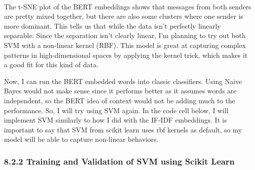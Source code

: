\documentclass[11pt]{article}
\begin{document}
    \begin{center}
    \end{center}
    { \hspace*{\fill} \\}
    
    The t-SNE plot of the BERT embeddings shows that messages from both
senders are pretty mixed together, but there are also some clusters
where one sender is more dominant. This tells us that while the data
isn't perfectly linearly separable. Since the separation isn't clearly
linear, I'm planning to try out both SVM with a non-linear kernel (RBF).
This model is great at capturing complex patterns in high-dimensional
spaces by applying the kernel trick, which makes it a good fit for this
kind of data.

    Now, I can run the BERT embedded words into classic classifiers. Using
Naive Bayes would not make sense since it performs better as it assumes
words are independent, so the BERT idea of context would not be adding
much to the performance. So, I will try using SVM again. In the code
cell below, I will implement SVM similarly to how I did with the IF-IDF
embeddings. It is important to say that SVM from scikit learn uses rbf
kernels as default, so my model will be able to capture non-linear
behaviors.

\subsubsection{8.2.2 Training and Validation of SVM using Scikit
Learn}\label{training-and-validation-of-svm-using-scikit-learn}
\end{document}
